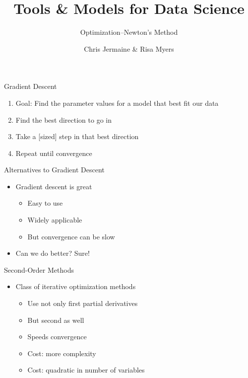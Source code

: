 \documentclass[aspectratio=169]{beamer}
\title[]
{Tools \& Models for Data Science}
\subtitle{Optimization--Newton's Method}
\author[]{Chris Jermaine \& Risa Myers}
\institute
{
  Rice University 
}
\date[]{}
\begin{document}
\begin{frame}
 \titlepage
\end{frame}

\begin{frame}{Gradient Descent}

\begin{enumerate}
\item Goal: Find the parameter values for a model that best fit our data
\item Find the best direction to go in
\item Take a [sized] step in that best direction
\item Repeat until convergence
\end{enumerate}
\end{frame}
\begin{frame}{Alternatives to Gradient Descent}

\begin{itemize}
        \item Gradient descent is great
        \begin{itemize}
                \item Easy to use
		\item Widely applicable
		\item But convergence can be slow
        \end{itemize}
	\item Can we do better?  Sure!
\end{itemize}
\end{frame}
\begin{frame}{Second-Order Methods}

\begin{itemize}
\item Class of iterative optimization methods
	\begin{itemize}
	\item Use not only first partial derivatives
	\item But second as well
	\item Speeds convergence
	\item Cost: more complexity
	\item Cost: quadratic in number of variables 
	\end{itemize}
\end{itemize}
\end{frame}
\end{document}
